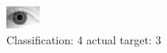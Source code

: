 \begin{figure}[h!]
\begin{center}
\includegraphics[width=0.60\columnwidth]{figures/ID2107_class_4_target_3.png}
\end{center}
\caption{ Classification: 4 actual target: 3}
\label{fig:ID2107_class_4_target_3}
\end{figure}
